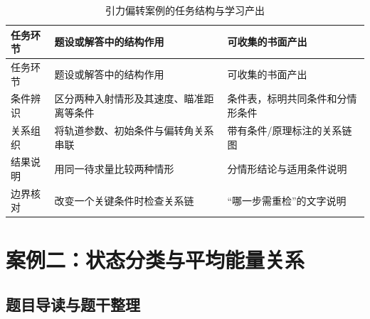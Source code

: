 \documentclass[
  12pt,
  a4paper]{ctexbook}
\begin{document}
\begin{longtable}[]{@{}
  >{\raggedright\arraybackslash}p{}
  >{\raggedright\arraybackslash}p{}
  >{\raggedright\arraybackslash}p{}@{}}
\caption{引力偏转案例的任务结构与学习产出}\tabularnewline
\toprule\noalign{}
\rowcolor{ThesisPale}
\begin{minipage}[b]{\linewidth}\raggedright
任务环节
\end{minipage} & \begin{minipage}[b]{\linewidth}\raggedright
题设或解答中的结构作用
\end{minipage} & \begin{minipage}[b]{\linewidth}\raggedright
可收集的书面产出
\end{minipage} \\
\midrule\noalign{}
\endfirsthead
\toprule\noalign{}
\rowcolor{ThesisPale}
\begin{minipage}[b]{\linewidth}\raggedright
任务环节
\end{minipage} & \begin{minipage}[b]{\linewidth}\raggedright
题设或解答中的结构作用
\end{minipage} & \begin{minipage}[b]{\linewidth}\raggedright
可收集的书面产出
\end{minipage} \\
\midrule\noalign{}
\endhead
\bottomrule\noalign{}
\endlastfoot
条件辨识 & 区分两种入射情形及其速度、瞄准距离等条件 &
条件表，标明共同条件和分情形条件 \\
关系组织 & 将轨道参数、初始条件与偏转角关系串联 &
带有条件/原理标注的关系链图 \\
结果说明 & 用同一待求量比较两种情形 & 分情形结论与适用条件说明 \\
边界核对 & 改变一个关键条件时检查关系链 & ``哪一步需重检''的文字说明 \\
\end{longtable}

\section{案例二：状态分类与平均能量关系}\label{ux6848ux4f8bux4e8cux72b6ux6001ux5206ux7c7bux4e0eux5e73ux5747ux80fdux91cfux5173ux7cfb}

\subsection{题目导读与题干整理}\label{ux9898ux76eeux5bfcux8bfbux4e0eux9898ux5e72ux6574ux7406-1}
\end{document}

